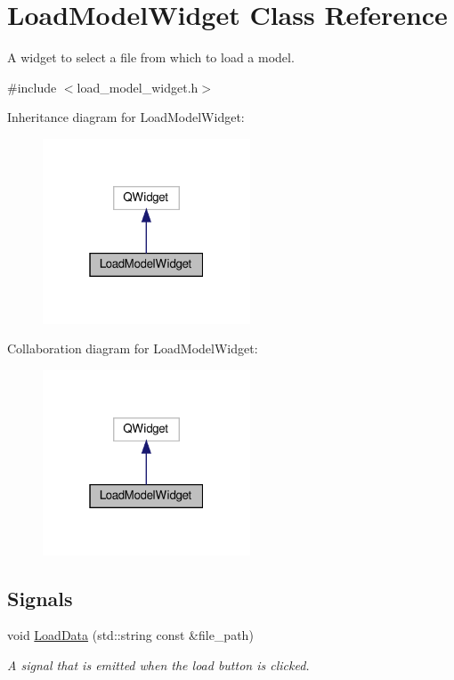 \hypertarget{classLoadModelWidget}{}\section{Load\+Model\+Widget Class Reference}
\label{classLoadModelWidget}


A widget to select a file from which to load a model.  




{\ttfamily \#include $<$load\+\_\+model\+\_\+widget.\+h$>$}



Inheritance diagram for Load\+Model\+Widget\+:\nopagebreak
\begin{figure}[H]
\begin{center}
\leavevmode
\includegraphics[width=175pt]{classLoadModelWidget__inherit__graph}
\end{center}
\end{figure}


Collaboration diagram for Load\+Model\+Widget\+:\nopagebreak
\begin{figure}[H]
\begin{center}
\leavevmode
\includegraphics[width=175pt]{classLoadModelWidget__coll__graph}
\end{center}
\end{figure}
\subsection*{Signals}
\begin{DoxyCompactItemize}
\item 
\mbox{\label{classLoadModelWidget_a1f2f14a6cfa96c2d4f3524d8ce7c49d7}} 
void \hyperlink{classLoadModelWidget_a1f2f14a6cfa96c2d4f3524d8ce7c49d7}{Load\+Data} (std\+::string const \&file\+\_\+path)
\begin{DoxyCompactList}\small\item\em A signal that is emitted when the load button is clicked. \end{DoxyCompactList}\end{DoxyCompactItemize}
